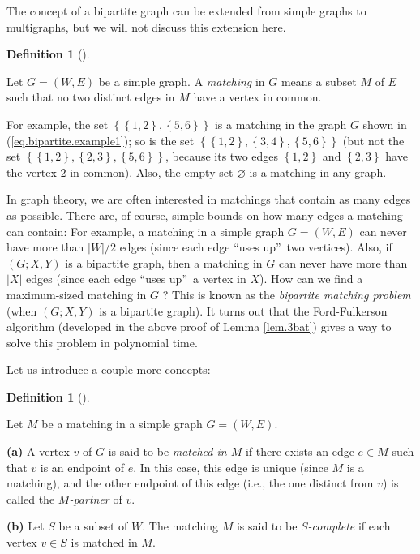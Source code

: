 \documentclass[numbers=enddot,12pt,final,onecolumn,notitlepage]{scrartcl}%
\theoremstyle{definition}
\newtheorem{defi}[theo]{Definition}
\newenvironment{definition}[1][]
{\begin{defi}[#1]\begin{leftbar}}
{\end{leftbar}\end{defi}}
\begin{document}
The concept of a bipartite graph can be extended from simple graphs to
multigraphs, but we will not discuss this extension here.

\begin{definition}
Let $G=\left(  W,E\right)  $ be a simple graph. A \textit{matching} in $G$
means a subset $M$ of $E$ such that no two distinct edges in $M$ have a vertex
in common.
\end{definition}

For example, the set $\left\{  \left\{  1,2\right\}  ,\left\{  5,6\right\}
\right\}  $ is a matching in the graph $G$ shown in
(\ref{eq.bipartite.example1}); so is the set $\left\{  \left\{  1,2\right\}
,\left\{  3,4\right\}  ,\left\{  5,6\right\}  \right\}  $ (but not the set
$\left\{  \left\{  1,2\right\}  ,\left\{  2,3\right\}  ,\left\{  5,6\right\}
\right\}  $, because its two edges $\left\{  1,2\right\}  $ and $\left\{
2,3\right\}  $ have the vertex $2$ in common). Also, the empty set
$\varnothing$ is a matching in any graph.

In graph theory, we are often interested in matchings that contain as many
edges as possible. There are, of course, simple bounds on how many edges a
matching can contain: For example, a matching in a simple graph $G=\left(
W,E\right)  $ can never have more than $\left\vert W\right\vert /2$ edges
(since each edge \textquotedblleft uses up\textquotedblright\ two vertices).
Also, if $\left(  G;X,Y\right)  $ is a bipartite graph, then a matching in $G$
can never have more than $\left\vert X\right\vert $ edges (since each edge
\textquotedblleft uses up\textquotedblright\ a vertex in $X$). How can we find
a maximum-sized matching in $G$ ? This is known as the \textit{bipartite
matching problem} (when $\left(  G;X,Y\right)  $ is a bipartite graph). It
turns out that the Ford-Fulkerson algorithm (developed in the above proof of
Lemma \ref{lem.3bat}) gives a way to solve this problem in polynomial time.

Let us introduce a couple more concepts:

\begin{definition}
Let $M$ be a matching in a simple graph $G=\left(  W,E\right)  $.

\textbf{(a)} A vertex $v$ of $G$ is said to be \textit{matched in $M$} if
there exists an edge $e\in M$ such that $v$ is an endpoint of $e$. In this
case, this edge is unique (since $M$ is a matching), and the other endpoint of
this edge (i.e., the one distinct from $v$) is called the \textit{$M$-partner}
of $v$.

\textbf{(b)} Let $S$ be a subset of $W$. The matching $M$ is said to be
\textit{$S$-complete} if each vertex $v\in S$ is matched in $M$.
\end{definition}
\end{document}
